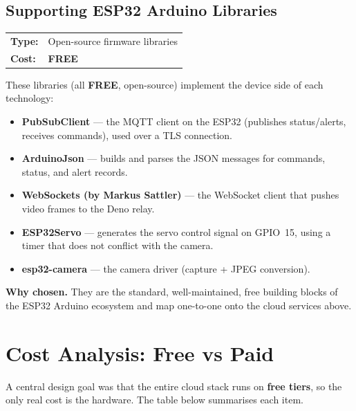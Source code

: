 \documentclass[11pt,a4paper]{article}
\makeatletter
\newcommand{\free}{\textbf{\color{freegreen}FREE}}
\newcommand{\techhead}[2]{\par\vspace{0.3em}\noindent
  \begin{tabularx}{\linewidth}{@{}lX@{}}
  \textbf{Type:} & #1 \\
  \textbf{Cost:} & #2 \\
  \end{tabularx}\par\vspace{0.3em}}
\makeatother
\begin{document}
\subsection{Supporting ESP32 Arduino Libraries}
\techhead{Open-source firmware libraries}{\free}
These libraries (all \free, open-source) implement the device side of each technology:
\begin{itemize}[nosep,leftmargin=1.4em]
  \item \textbf{PubSubClient} --- the MQTT client on the ESP32 (publishes status/alerts,
        receives commands), used over a TLS connection.
  \item \textbf{ArduinoJson} --- builds and parses the JSON messages for commands, status, and
        alert records.
  \item \textbf{WebSockets (by Markus Sattler)} --- the WebSocket client that pushes video
        frames to the Deno relay.
  \item \textbf{ESP32Servo} --- generates the servo control signal on GPIO~15, using a timer
        that does not conflict with the camera.
  \item \textbf{esp32-camera} --- the camera driver (capture + JPEG conversion).
\end{itemize}
\textbf{Why chosen.} They are the standard, well-maintained, free building blocks of the ESP32
Arduino ecosystem and map one-to-one onto the cloud services above.

\section{Cost Analysis: Free vs Paid}\label{sec:cost}
A central design goal was that the entire cloud stack runs on \textbf{free tiers}, so the only
real cost is the hardware. The table below summarises each item.
\end{document}
